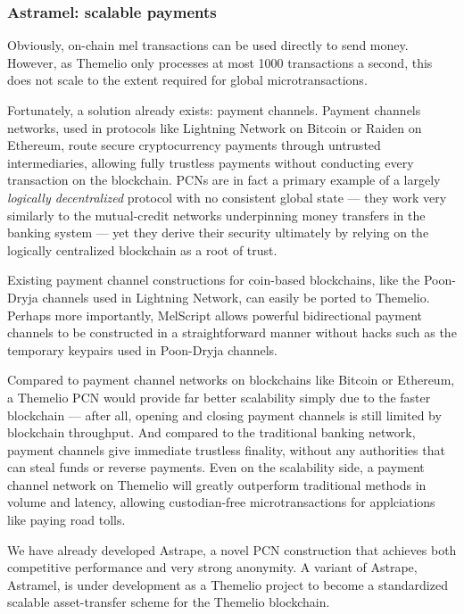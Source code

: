 \documentclass[]{article}
\begin{document}
\hypertarget{astramel-scalable-payments}{%
\subsubsection{Astramel: scalable
payments}\label{astramel-scalable-payments}}

Obviously, on-chain mel transactions can be used directly to send money.
However, as Themelio only processes at most 1000 transactions a second,
this does not scale to the extent required for global microtransactions.

Fortunately, a solution already exists: payment channels. Payment
channels networks, used in protocols like Lightning Network on Bitcoin
or Raiden on Ethereum, route secure cryptocurrency payments through
untrusted intermediaries, allowing fully trustless payments without
conducting every transaction on the blockchain. PCNs are in fact a
primary example of a largely \emph{logically decentralized} protocol
with no consistent global state --- they work very similarly to the
mutual-credit networks underpinning money transfers in the banking
system --- yet they derive their security ultimately by relying on the
logically centralized blockchain as a root of trust.

Existing payment channel constructions for coin-based blockchains, like
the Poon-Dryja channels used in Lightning Network, can easily be ported
to Themelio. Perhaps more importantly, MelScript allows powerful
bidirectional payment channels to be constructed in a straightforward
manner without hacks such as the temporary keypairs used in Poon-Dryja
channels.

Compared to payment channel networks on blockchains like Bitcoin or
Ethereum, a Themelio PCN would provide far better scalability simply due
to the faster blockchain --- after all, opening and closing payment
channels is still limited by blockchain throughput. And compared to the
traditional banking network, payment channels give immediate trustless
finality, without any authorities that can steal funds or reverse
payments. Even on the scalability side, a payment channel network on
Themelio will greatly outperform traditional methods in volume and
latency, allowing custodian-free microtransactions for applciations like
paying road tolls.

We have already developed Astrape, a novel PCN construction that
achieves both competitive performance and very strong anonymity. A
variant of Astrape, Astramel, is under development as a Themelio project
to become a standardized scalable asset-transfer scheme for the Themelio
blockchain.
\end{document}
